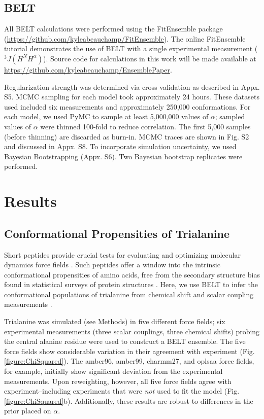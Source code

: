 \documentclass[11pt,titlepage]{article}
\begin{document}
\subsection*{BELT}

All BELT calculations were performed using the FitEnsemble package (\url{https://github.com/kyleabeauchamp/FitEnsemble}).  The online FitEnsemble tutorial demonstrates the use of BELT with a single experimental measurement ($^3J(H^N H^\alpha)$).  Source code for calculations in this work will be made available at \url{https://github.com/kyleabeauchamp/EnsemblePaper}.  

Regularization strength was determined via cross validation as described in Appx. S5.  MCMC sampling for each model took approximately 24 hours.  These datasets used included six measurements and approximately 250,000 conformations.  For each model, we used PyMC to sample at least 5,000,000 values of $\alpha$; sampled values of $\alpha$ were thinned 100-fold to reduce correlation.  The first 5,000 samples (before thinning) are discarded as burn-in.  MCMC traces are shown in Fig. S2 and discussed in Appx. S8.  To incorporate simulation uncertainty, we used Bayesian Bootstrapping (Appx. S6).  Two Bayesian bootstrap replicates were performed.  

\section*{Results}

\subsection*{Conformational Propensities of Trialanine}

Short peptides provide crucial tests for evaluating and optimizing molecular dynamics force fields  \citep{Graf2007,beauchamp2012protein, Nerenberg2011, Best2008, Grdadolnik2011}.  Such peptides offer a window into the intrinsic conformational propensities of amino acids, free from the secondary structure bias found in statistical surveys of protein structures  \citep{Jha2005}.  Here, we use BELT to infer the conformational populations of trialanine from chemical shift and scalar coupling measurements  \citep{Graf2007}.  

Trialanine was simulated (see Methods) in five different force fields; six experimental measurements (three scalar couplings, three chemical shifts) probing the central alanine residue were used to construct a BELT ensemble.  The five force fields show considerable variation in their agreement with experiment (Fig. \ref{figure:ChiSquared}).  The amber96, amber99, charmm27, and oplsaa force fields, for example, initially show significant deviation from the experimental measurements.  Upon reweighting, however, all five force fields agree with experiment--including experiments that were \emph{not} used to fit the model (Fig. \ref{figure:ChiSquared}b).  Additionally, these results are robust to differences in the prior placed on $\alpha$.
\end{document}
